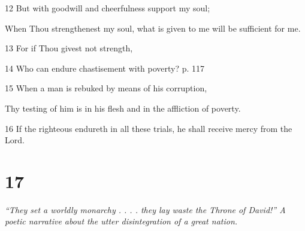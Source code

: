 \par 12 But with goodwill and cheerfulness support my soul;
\par  When Thou strengthenest my soul, what is given to me will be sufficient for me.
\par 13 For if Thou givest not strength,
\par 14 Who can endure chastisement with poverty? p. 117
\par 15 When a man is rebuked by means of his corruption,
\par  Thy testing of him is in his flesh and in the affliction of poverty.
\par 16 If the righteous endureth in all these trials, he shall receive mercy from the Lord.

\chapter{17}

\par \textit{“They set a worldly monarchy . . . . they lay waste the Throne of David!” A poetic narrative about the utter disintegration of a great nation.}

